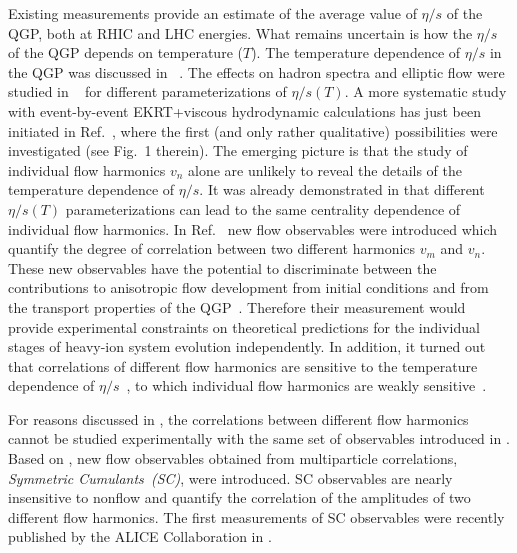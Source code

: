 Existing measurements provide an estimate of the average value of $\eta/s$ of the QGP, both at RHIC and LHC energies. What remains uncertain is how the $\eta/s$ of the QGP depends on temperature ($T$). The temperature dependence of $\eta/s$ in the QGP was discussed in ~\cite{Csernai:2006zz}. The effects on hadron spectra and elliptic flow were studied in ~\cite{Niemi:2011ix} for different parameterizations of $\eta/s(T)$.  A more systematic study with event-by-event EKRT+viscous hydrodynamic calculations has just been initiated in Ref.~\cite{Niemi:2015qia}, where the first (and only rather qualitative) possibilities were investigated (see Fig.~1 therein). The emerging picture is that the study of individual flow harmonics $v_n$ alone are unlikely to reveal the details of the temperature dependence of $\eta/s$.
It was already demonstrated in \cite{Niemi:2015qia} that different $\eta/s(T)$ parameterizations can lead to the same centrality dependence of individual flow harmonics. In Ref.~\cite{Niemi:2012aj} new flow observables were introduced which quantify the degree of correlation between two different harmonics $v_m$ and $v_n$. These new observables have the potential to discriminate between the contributions to anisotropic flow development from initial conditions and from the transport properties of the QGP~\cite{Niemi:2012aj}. Therefore their measurement would provide experimental constraints on theoretical predictions for the individual stages of heavy-ion system evolution independently. In addition, it turned out that correlations of different flow harmonics are sensitive to the temperature dependence of $\eta/s$~\cite{ALICE:2016kpq}, to which individual flow harmonics are weakly sensitive~\cite{Niemi:2015qia}. 
 
For reasons discussed in \cite{ALICE:2016kpq,Bilandzic:2013kga}, the correlations between different flow harmonics cannot be studied experimentally with the same set of observables introduced in \cite{Niemi:2012aj}. 
Based on \cite{Bilandzic:2013kga}, new flow observables obtained from multiparticle correlations, \textit{Symmetric Cumulants~(SC)}, were introduced. SC observables are nearly insensitive to nonflow and quantify the correlation of the amplitudes of two different flow harmonics.
The first measurements of SC observables were recently published by the ALICE Collaboration in \cite{ALICE:2016kpq}.

